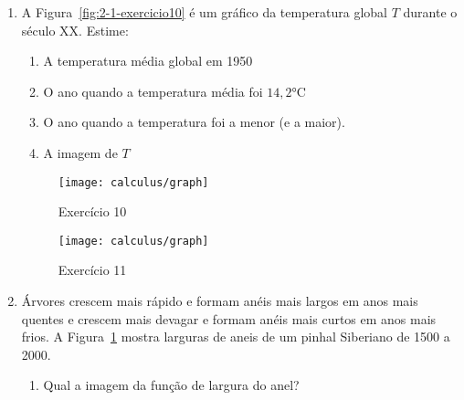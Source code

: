 \begin{enumerate}[label=\textbf{\arabic*.},leftmargin=*]
  \vspace{0.2cm}
  \vspace{0.0cm}
  
  \item A Figura~\ref{fig:2-1-exercicio10} é um gráfico da temperatura global $T$ durante o século XX. Estime:
  \begin{enumerate}
    \item A temperatura média global em 1950
    \item O ano quando a temperatura média foi $14,2\si\degreeCelsius$
    \item O ano quando a temperatura foi a menor (e a maior).
    \item A imagem de $T$
  \end{enumerate}
    \begin{figure}[!ht]
    \centering
    \begin{minipage}{0.49\columnwidth}
      \texttt{[image: calculus/graph]}
      \caption{Exercício 10}
      \label{fig:2-1-exercicio10}
    \end{minipage}
    \begin{minipage}{0.49\columnwidth}
      \texttt{[image: calculus/graph]}
      \caption{Exercício 11}
      \label{fig:2-1-exercicio11}
    \end{minipage}
  \end{figure}
  \item Árvores crescem mais rápido e formam anéis mais largos em anos mais quentes e crescem mais devagar e formam anéis mais curtos em anos mais frios. A Figura~\ref{fig:2-1-exercicio11} mostra larguras de aneis de um pinhal Siberiano de 1500 a 2000.
  \begin{enumerate}
    \item Qual a imagem da função de largura do anel?

\end{enumerate}
\end{enumerate}
